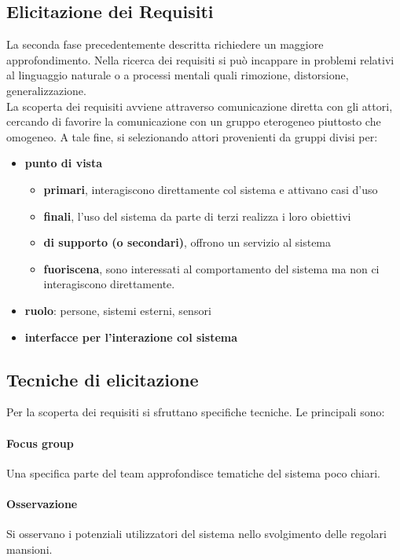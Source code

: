 \subsection{Elicitazione dei Requisiti}
\label{elicitazione}
La seconda fase precedentemente descritta richiedere un maggiore approfondimento. Nella ricerca dei requisiti si può incappare in problemi relativi al linguaggio naturale o a processi mentali quali rimozione, distorsione, generalizzazione. \\
La scoperta dei requisiti avviene attraverso comunicazione diretta con gli attori, cercando di favorire la comunicazione con un gruppo eterogeneo piuttosto che omogeneo. A tale fine, si selezionando attori provenienti da gruppi divisi per:
\begin{itemize}
    \item \textbf{punto di vista}
    \begin{itemize}
        \item \textbf{primari}, interagiscono direttamente col sistema e attivano casi d'uso
        \item \textbf{finali}, l'uso del sistema da parte di terzi realizza i loro obiettivi
        \item \textbf{di supporto (o secondari)}, offrono un servizio al sistema
        \item \textbf{fuoriscena}, sono interessati al comportamento del sistema ma non ci interagiscono direttamente.
    \end{itemize}
    \item \textbf{ruolo}: persone, sistemi esterni, sensori
    \item \textbf{interfacce per l'interazione col sistema}
\end{itemize}
\subsection{Tecniche di elicitazione}
Per la scoperta dei requisiti si sfruttano specifiche tecniche. Le principali sono:
\paragraph{Focus group} Una specifica parte del team approfondisce tematiche del sistema poco chiari.
\paragraph{Osservazione} Si osservano i potenziali utilizzatori del sistema nello svolgimento delle regolari mansioni.
